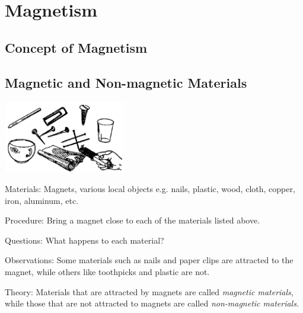 \section{Magnetism} 

\begin{multicols}{2}


\section*{Concept of Magnetism}


\subsection{Magnetic and Non-magnetic Materials}

\begin{center}
\includegraphics[width=0.4\textwidth]{./img/source/mag-non-mag.png}
\end{center}

\begin{description*}
\item[Materials:]{Magnets, various local objects e.g. nails, plastic, wood, cloth, copper, iron, aluminum, etc.}
\item[Procedure:]{Bring a magnet close to each of the materials listed above.}
\item[Questions:]{What happens to each material?}
\item[Observations:]{Some materials such as nails and paper clips are attracted to the magnet, while others like toothpicks and plastic are not.}
\item[Theory:]{Materials that are attracted by magnets are called \emph{magnetic materials}, while those that are not attracted to magnets are called \emph{non-magnetic materials}.}
\end{description*}


\end{multicols}
